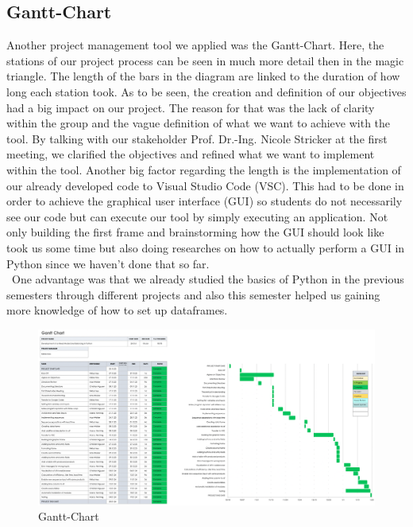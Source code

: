 \subsection{Gantt-Chart}
Another project management tool we applied was the Gantt-Chart. Here, the stations of our project process can be seen in much more detail then in the magic triangle. The length of the bars in the diagram are linked to the duration of how long each station took. As to be seen, the creation and definition of our objectives had a big impact on our project. The reason for that was the lack of clarity within the group and the vague definition of what we want to achieve with the tool. By talking with our stakeholder Prof. Dr.-Ing. Nicole Stricker at the first meeting, we clarified the objectives and refined what we want to implement within the tool. Another big factor regarding the length is the implementation of our already developed code to Visual Studio Code (VSC). This had to be done in order to achieve the graphical user interface (GUI) so students do not necessarily see our code but can execute our tool by simply executing an application. Not only building the first frame and brainstorming how the GUI should look like took us some time but also doing researches on how to actually perform a GUI in Python since we haven't done that so far. \\ One advantage was that we already studied the basics of Python in the previous semesters through different projects and also this semester helped us gaining more knowledge of how to set up dataframes. 
\begin{figure}[H]
\includegraphics[width=\linewidth]{Abbildungen/Gantt_Chart.png}
\vspace{-0.7cm}
\caption{Gantt-Chart}
\end{figure}
\vspace{-1cm}
